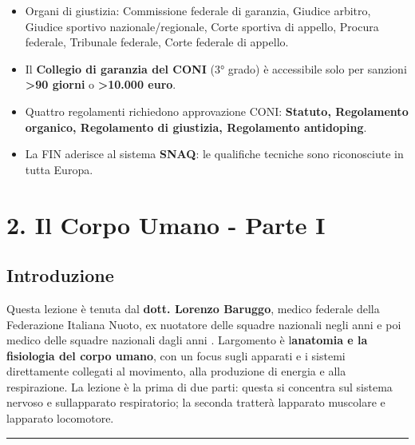 \documentclass[a4paper,11pt]{article}
\begin{document}
\begin{itemize}
            Principio fondamentale: \textbf{separazione tra potere gestionale e
                  potere giudiziario}. I giudici sportivi non sono revocabili dal
            Consiglio federale.
      \item
            Organi di giustizia: Commissione federale di garanzia, Giudice
            arbitro, Giudice sportivo nazionale/regionale, Corte sportiva di
            appello, Procura federale, Tribunale federale, Corte federale di
            appello.
      \item
            Il \textbf{Collegio di garanzia del CONI} (3° grado) è accessibile
            solo per sanzioni \textbf{\textgreater90 giorni} o
            \textbf{\textgreater10.000 euro}.
      \item
            Quattro regolamenti richiedono approvazione CONI: \textbf{Statuto,
                  Regolamento organico, Regolamento di giustizia, Regolamento
                  antidoping}.
      \item
            La FIN aderisce al sistema \textbf{SNAQ}: le qualifiche tecniche sono
            riconosciute in tutta Europa.
\end{itemize}

\section{2. Il Corpo Umano - Parte I}\label{il-corpo-umano---parte-i}

\subsection{Introduzione}\label{introduzione-1}

Questa lezione è tenuta dal \textbf{dott. Lorenzo Baruggo}, medico
federale della Federazione Italiana Nuoto, ex nuotatore delle squadre
nazionali negli anni  e poi medico delle squadre
nazionali dagli anni . L\textquotesingle argomento è
l\textquotesingle{}\textbf{anatomia e la fisiologia del corpo umano},
con un focus sugli apparati e i sistemi direttamente collegati al
movimento, alla produzione di energia e alla respirazione. La lezione è
la prima di due parti: questa si concentra sul sistema nervoso e
sull\textquotesingle apparato respiratorio; la seconda tratterà
l\textquotesingle apparato muscolare e l\textquotesingle apparato
locomotore.

\begin{center}\rule{0.5\linewidth}{0.5pt}\end{center}
\end{document}
